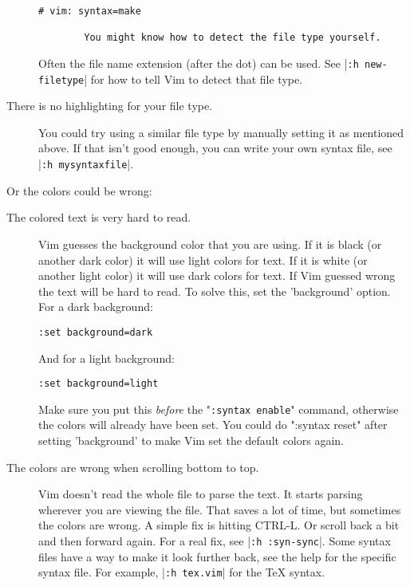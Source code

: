 \begin{description}
								\begin{Verbatim}[samepage=true]
		 # vim: syntax=make

		You might know how to detect the file type yourself.
								\end{Verbatim}

								Often the file name extension (after the dot) can be used.
								See |\verb!:h new-filetype!| for how to tell Vim to detect that file type.

				\item [There is no highlighting for your file type.]
								You could try using a similar file type by manually setting it as mentioned above.
								If that isn't good enough, you can write your own syntax file, see |\verb!:h mysyntaxfile!|.
\end{description}

Or the colors could be wrong:

\begin{description}
				\item [The colored text is very hard to read.]
								Vim guesses the background color that you are using.  If it is black
								(or another dark color) it will use light colors for text.  If it is
								white (or another light color) it will use dark colors for text.  If
								Vim guessed wrong the text will be hard to read.  To solve this, set
								the 'background' option.  For a dark background:

								\begin{Verbatim}[samepage=true]
		 :set background=dark
												\end{Verbatim}

								And for a light background:

								\begin{Verbatim}[samepage=true]
		 :set background=light
												\end{Verbatim}

								Make sure you put this \emph{before} the "\verb!:syntax enable!" command, otherwise the colors will already have been set.
								You could do ":syntax reset" after setting 'background' to make Vim set the default colors again.

				\item [The colors are wrong when scrolling bottom to top.]
								Vim doesn't read the whole file to parse the text.
								It starts parsing wherever you are viewing the file.
								That saves a lot of time, but sometimes the colors are wrong.
								A simple fix is hitting CTRL-L.
								Or scroll back a bit and then forward again.
								For a real fix, see |\verb!:h :syn-sync!|.
								Some syntax files have a way to make it look further back, see the help for the specific syntax file.
								For example, |\verb!:h tex.vim!| for the TeX syntax.
\end{description}


